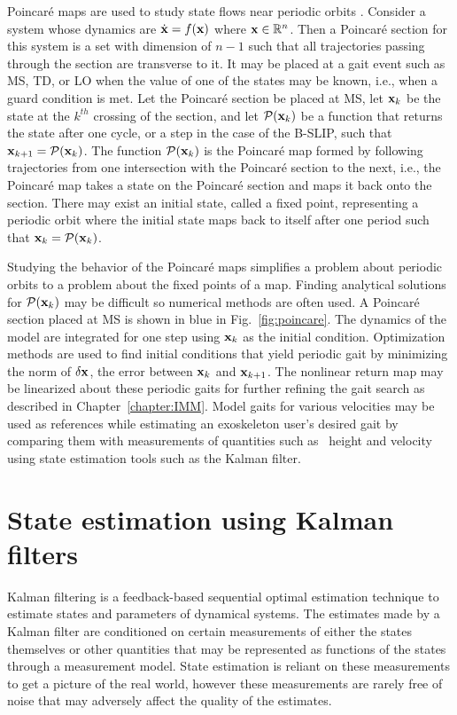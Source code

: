 Poincar\'e maps are used to study state flows near periodic orbits \cite{strogatz2018nonlinear}. Consider a system whose dynamics are $ \dot{\mathbf{x}} = f(\mathbf{x}) $ where $ \mathbf{x} \in \mathbb{R}^n $. Then a  Poincar\'e section for this system is a set with dimension of $ n-1 $ such that all trajectories passing through the section are transverse to it. It may be placed at a gait event such as MS, TD, or LO when the value of one of the states may be known, i.e., when a guard condition is met. Let the Poincar\'e section be placed at MS, let $ \mathbf{x}_k $ be the state at the $ k^{th} $ crossing of the section, and let $ \mathcal{P}(\mathbf{x}_k) $ be a function that returns the state after one cycle, or a step in the case of the B-SLIP, such that $ \mathbf{x}_{k+1} = \mathcal{P}(\mathbf{x}_k) $. The function $ \mathcal{P}(\mathbf{x}_k) $ is the Poincar\'e map formed by following trajectories from one intersection with the Poincar\'e section to the next, i.e., the Poincar\'e map takes a state on the Poincar\'e section and maps it back onto the section. There may exist an initial state, called a fixed point, representing a periodic orbit where the initial state maps back to itself after one period such that $ \mathbf{x}_k = \mathcal{P}(\mathbf{x}_k) $. 

Studying the behavior of the Poincar\'e maps simplifies a problem about periodic orbits to a problem about the fixed points of a map. Finding analytical solutions for $ \mathcal{P}(\mathbf{x}_k) $ may be difficult so numerical methods are often used. A Poincar\'e section placed at MS is shown in blue in Fig.~\ref{fig:poincare}. The dynamics of the model are integrated for one step using $ \mathbf{x}_k $ as the initial condition. Optimization methods are used to find initial conditions that yield periodic gait by minimizing the norm of $ \delta \mathbf{x} $, the error between $ \mathbf{x}_k $ and $ \mathbf{x}_{k+1} $. The nonlinear return map may be linearized about these periodic gaits for further refining the gait search as described in Chapter~\ref{chapter:IMM}. Model gaits for various velocities may be used as references while estimating an exoskeleton user's desired gait by comparing them with measurements of quantities such as \COM~height and velocity using state estimation tools such as the Kalman filter. 

\section{State estimation using Kalman filters}

Kalman filtering is a feedback-based sequential optimal estimation technique \cite{kalman1960new} to estimate states and parameters of dynamical systems. The estimates made by a Kalman filter are conditioned on certain measurements of either the states themselves or other quantities that may be represented as functions of the states through a measurement model. State estimation is reliant on these measurements to get a picture of the real world, however these measurements are rarely free of noise that may adversely affect the quality of the estimates. 

